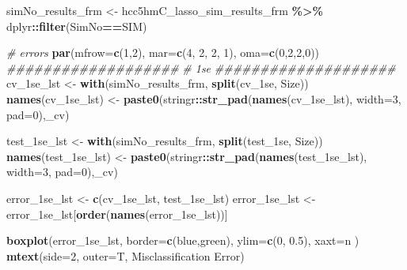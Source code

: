 \documentclass[
]{book}
\newenvironment{Shaded}{\begin{snugshade}}{\end{snugshade}}
\newcommand{\CommentTok}[1]{\textcolor[rgb]{0.56,0.35,0.01}{\textit{#1}}}
\newcommand{\DataTypeTok}[1]{\textcolor[rgb]{0.13,0.29,0.53}{#1}}
\newcommand{\DecValTok}[1]{\textcolor[rgb]{0.00,0.00,0.81}{#1}}
\newcommand{\FloatTok}[1]{\textcolor[rgb]{0.00,0.00,0.81}{#1}}
\newcommand{\KeywordTok}[1]{\textcolor[rgb]{0.13,0.29,0.53}{\textbf{#1}}}
\newcommand{\NormalTok}[1]{#1}
\newcommand{\OperatorTok}[1]{\textcolor[rgb]{0.81,0.36,0.00}{\textbf{#1}}}
\newcommand{\StringTok}[1]{\textcolor[rgb]{0.31,0.60,0.02}{#1}}
\begin{document}
\begin{Shaded}
\begin{Highlighting}[]
\NormalTok{simNo\_results\_frm <{-}}\StringTok{ }\NormalTok{hcc5hmC\_lasso\_sim\_results\_frm }\OperatorTok{\%>\%}\StringTok{ }\NormalTok{dplyr}\OperatorTok{::}\KeywordTok{filter}\NormalTok{(SimNo}\OperatorTok{==}\NormalTok{SIM)}


\CommentTok{\# errors}
\KeywordTok{par}\NormalTok{(}\DataTypeTok{mfrow=}\KeywordTok{c}\NormalTok{(}\DecValTok{1}\NormalTok{,}\DecValTok{2}\NormalTok{), }\DataTypeTok{mar=}\KeywordTok{c}\NormalTok{(}\DecValTok{4}\NormalTok{, }\DecValTok{2}\NormalTok{, }\DecValTok{2}\NormalTok{, }\DecValTok{1}\NormalTok{), }\DataTypeTok{oma=}\KeywordTok{c}\NormalTok{(}\DecValTok{0}\NormalTok{,}\DecValTok{2}\NormalTok{,}\DecValTok{2}\NormalTok{,}\DecValTok{0}\NormalTok{))}
\CommentTok{\#\#\#\#\#\#\#\#\#\#\#\#\#\#\#\#\#\#\#}
\CommentTok{\# 1se}
\CommentTok{\#\#\#\#\#\#\#\#\#\#\#\#\#\#\#\#\#\#\#\#}
\NormalTok{cv\_1se\_lst <{-}}\StringTok{ }\KeywordTok{with}\NormalTok{(simNo\_results\_frm,}
 \KeywordTok{split}\NormalTok{(cv\_1se, Size))}
\KeywordTok{names}\NormalTok{(cv\_1se\_lst) <{-}}\StringTok{ }\KeywordTok{paste0}\NormalTok{(stringr}\OperatorTok{::}\KeywordTok{str\_pad}\NormalTok{(}\KeywordTok{names}\NormalTok{(cv\_1se\_lst), }\DataTypeTok{width=}\DecValTok{3}\NormalTok{, }\DataTypeTok{pad=}\StringTok{\textquotesingle{}0\textquotesingle{}}\NormalTok{),}\StringTok{\textquotesingle{}\_cv\textquotesingle{}}\NormalTok{)}

\NormalTok{test\_1se\_lst <{-}}\StringTok{ }\KeywordTok{with}\NormalTok{(simNo\_results\_frm,}
 \KeywordTok{split}\NormalTok{(test\_1se, Size))}
\KeywordTok{names}\NormalTok{(test\_1se\_lst) <{-}}\StringTok{ }\KeywordTok{paste0}\NormalTok{(stringr}\OperatorTok{::}\KeywordTok{str\_pad}\NormalTok{(}\KeywordTok{names}\NormalTok{(test\_1se\_lst), }\DataTypeTok{width=}\DecValTok{3}\NormalTok{, }\DataTypeTok{pad=}\StringTok{\textquotesingle{}0\textquotesingle{}}\NormalTok{),}\StringTok{\textquotesingle{}\_cv\textquotesingle{}}\NormalTok{)}

\NormalTok{error\_1se\_lst <{-}}\StringTok{ }\KeywordTok{c}\NormalTok{(cv\_1se\_lst, test\_1se\_lst)}
\NormalTok{error\_1se\_lst <{-}}\StringTok{ }\NormalTok{error\_1se\_lst[}\KeywordTok{order}\NormalTok{(}\KeywordTok{names}\NormalTok{(error\_1se\_lst))]}

\KeywordTok{boxplot}\NormalTok{(error\_1se\_lst, }
  \DataTypeTok{border=}\KeywordTok{c}\NormalTok{(}\StringTok{\textquotesingle{}blue\textquotesingle{}}\NormalTok{,}\StringTok{\textquotesingle{}green\textquotesingle{}}\NormalTok{), }
  \DataTypeTok{ylim=}\KeywordTok{c}\NormalTok{(}\DecValTok{0}\NormalTok{, }\FloatTok{0.5}\NormalTok{),}
  \DataTypeTok{xaxt=}\StringTok{\textquotesingle{}n\textquotesingle{}}
\NormalTok{)}
\KeywordTok{mtext}\NormalTok{(}\DataTypeTok{side=}\DecValTok{2}\NormalTok{, }\DataTypeTok{outer=}\NormalTok{T,  }\StringTok{\textquotesingle{}Misclassification Error\textquotesingle{}}\NormalTok{)}


\end{Highlighting}
\end{Shaded}
\end{document}
